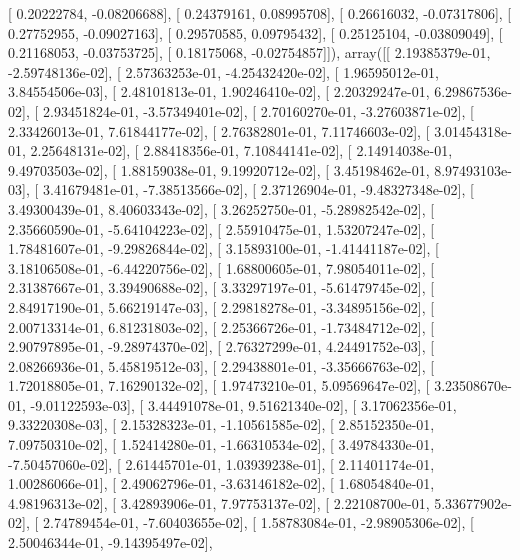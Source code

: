 \documentclass{article}
\begin{document}
       [ 0.20222784, -0.08206688],
       [ 0.24379161,  0.08995708],
       [ 0.26616032, -0.07317806],
       [ 0.27752955, -0.09027163],
       [ 0.29570585,  0.09795432],
       [ 0.25125104, -0.03809049],
       [ 0.21168053, -0.03753725],
       [ 0.18175068, -0.02754857]]), array([[  2.19385379e-01,  -2.59748136e-02],
       [  2.57363253e-01,  -4.25432420e-02],
       [  1.96595012e-01,   3.84554506e-03],
       [  2.48101813e-01,   1.90246410e-02],
       [  2.20329247e-01,   6.29867536e-02],
       [  2.93451824e-01,  -3.57349401e-02],
       [  2.70160270e-01,  -3.27603871e-02],
       [  2.33426013e-01,   7.61844177e-02],
       [  2.76382801e-01,   7.11746603e-02],
       [  3.01454318e-01,   2.25648131e-02],
       [  2.88418356e-01,   7.10844141e-02],
       [  2.14914038e-01,   9.49703503e-02],
       [  1.88159038e-01,   9.19920712e-02],
       [  3.45198462e-01,   8.97493103e-03],
       [  3.41679481e-01,  -7.38513566e-02],
       [  2.37126904e-01,  -9.48327348e-02],
       [  3.49300439e-01,   8.40603343e-02],
       [  3.26252750e-01,  -5.28982542e-02],
       [  2.35660590e-01,  -5.64104223e-02],
       [  2.55910475e-01,   1.53207247e-02],
       [  1.78481607e-01,  -9.29826844e-02],
       [  3.15893100e-01,  -1.41441187e-02],
       [  3.18106508e-01,  -6.44220756e-02],
       [  1.68800605e-01,   7.98054011e-02],
       [  2.31387667e-01,   3.39490688e-02],
       [  3.33297197e-01,  -5.61479745e-02],
       [  2.84917190e-01,   5.66219147e-03],
       [  2.29818278e-01,  -3.34895156e-02],
       [  2.00713314e-01,   6.81231803e-02],
       [  2.25366726e-01,  -1.73484712e-02],
       [  2.90797895e-01,  -9.28974370e-02],
       [  2.76327299e-01,   4.24491752e-03],
       [  2.08266936e-01,   5.45819512e-03],
       [  2.29438801e-01,  -3.35666763e-02],
       [  1.72018805e-01,   7.16290132e-02],
       [  1.97473210e-01,   5.09569647e-02],
       [  3.23508670e-01,  -9.01122593e-03],
       [  3.44491078e-01,   9.51621340e-02],
       [  3.17062356e-01,   9.33220308e-03],
       [  2.15328323e-01,  -1.10561585e-02],
       [  2.85152350e-01,   7.09750310e-02],
       [  1.52414280e-01,  -1.66310534e-02],
       [  3.49784330e-01,  -7.50457060e-02],
       [  2.61445701e-01,   1.03939238e-01],
       [  2.11401174e-01,   1.00286066e-01],
       [  2.49062796e-01,  -3.63146182e-02],
       [  1.68054840e-01,   4.98196313e-02],
       [  3.42893906e-01,   7.97753137e-02],
       [  2.22108700e-01,   5.33677902e-02],
       [  2.74789454e-01,  -7.60403655e-02],
       [  1.58783084e-01,  -2.98905306e-02],
       [  2.50046344e-01,  -9.14395497e-02],
\end{document}
